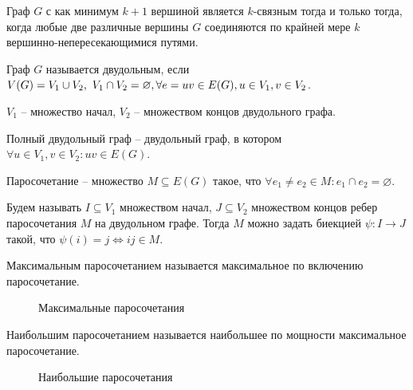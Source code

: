 	\begin{Cons}
		Граф $G$ с как минимум $k+1$ вершиной является $k$-связным тогда и только тогда, когда любые две различные вершины $G$ соединяются по крайней мере $k$ вершинно-непересекающимися путями.
	\end{Cons}


	\begin{Def}
		Граф $G$ называется двудольным, если $V(G) = V_1 \cup V_2, \ V_1 \cap V_2 = \varnothing,\\
		\forall e = uv \in E(G), u \in V_1, v \in V_2$.
		
		$V_1$ -- множество начал, $V_2$ -- множеством концов двудольного графа.
	\end{Def}

	\begin{Def}
		Полный двудольный граф -- двудольный граф, в котором $\forall u \in V_1, v \in V_2: uv \in E(G)$.
	\end{Def}

	\begin{Def}
		Паросочетание -- множество $M \subseteq E(G)$ такое, что $\forall e_1 \neq e_2 \in M: e_1 \cap e_2 = \varnothing$.

		Будем называть $I \subseteq V_1$ множеством начал, $J \subseteq V_2$ множеством концов ребер паросочетания $M$ на двудольном графе. Тогда $M$ можно задать
		биекцией $\psi : I \to J$ такой, что $\psi(i) = j \Leftrightarrow ij \in M$.
	\end{Def}

	\begin{Def}
		Максимальным паросочетанием называется максимальное по включению паросочетание.
	\end{Def}

	\begin{figure*}[h]
		\centering
		\def\svgwidth{0.3\columnwidth}
		
		\caption{Максимальные паросочетания}
	\end{figure*}
		
	\begin{Def}
		Наибольшим паросочетанием называется наибольшее по мощности максимальное паросочетание.
	\end{Def}

	\begin{figure*}[h]
		\centering
		\def\svgwidth{0.3\columnwidth}
		
		\caption{Наибольшие паросочетания}
	\end{figure*}

